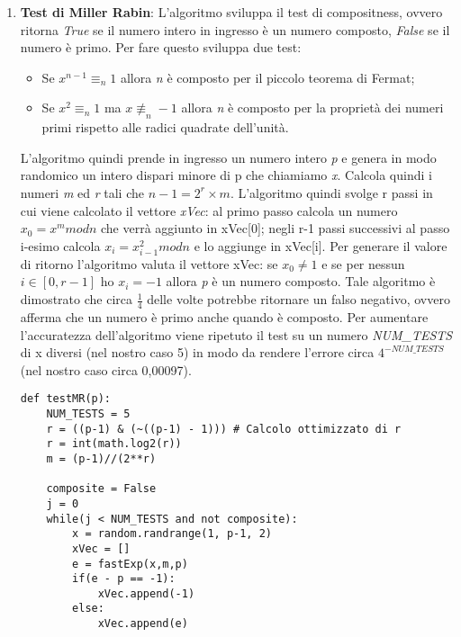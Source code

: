 \documentclass{article}
\begin{document}
\begin{enumerate}
    \item \textbf{Test di Miller Rabin}: L'algoritmo sviluppa il test di compositness, ovvero ritorna \textit{True} se il numero intero in ingresso è un numero composto, \textit{False} se il numero è primo. Per fare questo sviluppa due test:
    \begin{itemize}
        \item Se $x^{n-1} \equiv_n 1$ allora \textit{n} è composto per il piccolo teorema di Fermat;
        \item Se $x^2 \equiv_n 1$ ma $x \not\equiv_n -1$ allora \textit{n} è composto per la proprietà dei numeri primi rispetto alle radici quadrate dell'unità.
    \end{itemize}
    L'algoritmo quindi prende in ingresso un numero intero \textit{p} e genera in modo randomico un intero dispari minore di p che chiamiamo \textit{x}. Calcola quindi i numeri \textit{m} ed \textit{r} tali che $n-1 = 2^r \times m$. L'algoritmo quindi svolge r passi in cui viene calcolato il vettore \textit{xVec}: al primo passo calcola un numero $x_0 = x^m mod n$ che verrà aggiunto in xVec[0]; negli r-1 passi successivi al passo i-esimo calcola $x_i = x_{i-1}^2 mod n$ e lo aggiunge in xVec[i]. Per generare il valore di ritorno l'algoritmo valuta il vettore xVec: se $x_0 \neq 1$ e se per nessun $i \in [0,r-1]$ ho $x_i = -1$ allora \textit{p} è un numero composto. Tale algoritmo è dimostrato che circa $\frac{1}{4}$ delle volte potrebbe ritornare un falso negativo, ovvero afferma che un numero è primo anche quando è composto. Per aumentare l'accuratezza dell'algoritmo viene ripetuto il test su un numero \textit{NUM\_TESTS} di x diversi (nel nostro caso 5) in modo da rendere l'errore circa $4^{-NUM\_TESTS}$ (nel nostro caso circa 0,00097).
    \begin{lstlisting}
def testMR(p): 
    NUM_TESTS = 5
    r = ((p-1) & (~((p-1) - 1))) # Calcolo ottimizzato di r
    r = int(math.log2(r))
    m = (p-1)//(2**r)

    composite = False 
    j = 0
    while(j < NUM_TESTS and not composite): 
        x = random.randrange(1, p-1, 2) 
        xVec = [] 
        e = fastExp(x,m,p)
        if(e - p == -1):
            xVec.append(-1)
        else:
            xVec.append(e)
            

\end{lstlisting}
\end{enumerate}
\end{document}
